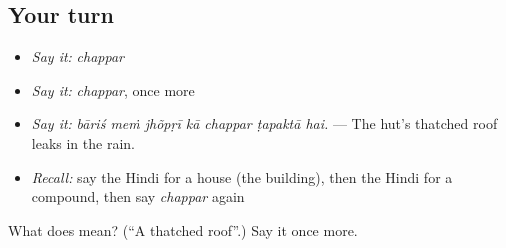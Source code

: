 \subsection*{Your turn}
\begin{itemize}
\raggedright
  \item \emph{Say it:} \emph{chappar}
  \item \emph{Say it:} \emph{chappar}, once more
  \item \emph{Say it:} \emph{bāriś meṁ jhõpṛī kā chappar ṭapaktā hai.} — The hut's thatched roof leaks in the rain.
  \item \emph{Recall:} say the Hindi for a house (the building), then the Hindi for a compound, then say \emph{chappar} again
\end{itemize}

\begin{tcolorbox}[breakable,colback=teal!4,colframe=teal!35!black,title={Before you move on}]
What does  mean? (\textquotedblleft{}A thatched roof\textquotedblright{}.) Say it once more.
\end{tcolorbox}

